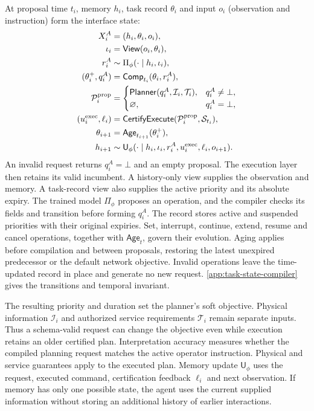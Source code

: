 \documentclass[preprint,12pt]{elsarticle}
\newcommand{\appref}[1]{\ref{#1}}
\begin{document}
At proposal time $t_i$, memory $h_i$, task record $\theta_i$ and input $o_i$
(observation and instruction) form the interface state:
\begin{equation}
\begin{aligned}
X_i^A&=(h_i,\theta_i,o_i),\\
\iota_i&=\mathsf{View}(o_i,\theta_i),\\
r_i^A&\sim\Pi_\phi(\cdot\mid h_i,\iota_i),\\
(\theta_i^+,q_i^A)&=\mathsf{Comp}_{t_i}(\theta_i,r_i^A),\\
\mathcal P_i^{\rm prop}
&=\begin{cases}\mathsf{Planner}(q_i^A,\mathcal I_i,\mathcal T_i),&q_i^A\ne\bot,\\
\varnothing,&q_i^A=\bot,\end{cases}\\
(u_i^{\rm exec},\ell_i)
&=\mathsf{CertifyExecute}(\mathcal P_i^{\rm prop},\mathcal S_{t_i}),\\
\theta_{i+1}&=\mathsf{Age}_{t_{i+1}}(\theta_i^+),\\
h_{i+1}&\sim\mathsf U_\phi(\cdot\mid
h_i,\iota_i,r_i^A,u_i^{\rm exec},\ell_i,o_{i+1}).
\end{aligned}
\label{eq:new-agent-state}
\end{equation}
An invalid request returns $q_i^A=\bot$ and an empty proposal. The execution layer then retains its valid incumbent.
A history-only view supplies the observation and memory. A task-record view
also supplies the active priority and its absolute expiry. The trained model
$\Pi_\phi$ proposes an operation, and the compiler checks its fields and
transition before forming $q_i^A$. The record stores active and suspended
priorities with their original expiries. Set, interrupt, continue, extend,
resume and cancel operations, together with $\mathsf{Age}_t$, govern their
evolution. Aging applies before compilation and between proposals, restoring
the latest unexpired predecessor or the default network objective. Invalid
operations leave the time-updated record in place and generate no new request.
\appref{app:task-state-compiler} gives the transitions and temporal invariant.

The resulting priority and duration set the planner's soft objective.
Physical information $\mathcal I_i$ and authorized service requirements
$\mathcal T_i$ remain separate inputs. Thus a schema-valid request can
change the objective even while execution retains an older certified plan.
Interpretation accuracy measures whether the compiled planning request
matches the active operator instruction. Physical and service guarantees
apply to the executed plan. Memory update $\mathsf U_\phi$
uses the request, executed command, certification feedback $\ell_i$ and next
observation. If memory has only one possible state, the agent uses the current supplied
information without storing an additional history of earlier interactions.
\end{document}
